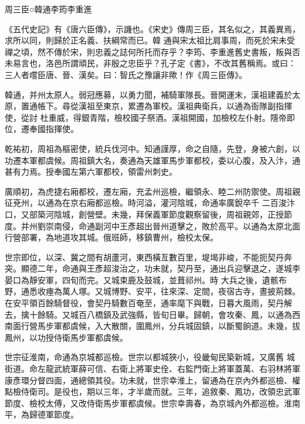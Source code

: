 
\begin{pinyinscope}

 周三臣○韓通李筠李重進



 《五代史記》有《唐六臣傳》，示譏也。《宋史》傳周三臣，其名似之，其義異焉，求所以同，則歸於正名義、扶綱常而已。韓
 通與宋太祖比肩事周，而死於宋未受禪之頃，然不傳於宋，則忠義之誌何所托而存乎？李筠、李重進舊史書叛，叛與否未易言也，洛邑所謂頑民，非殷之忠臣乎？孔子定《書》，不改其舊稱焉。或曰：三人者嚐臣唐、晉、漢矣。曰：智氏之豫讓非歟！作《周三臣傳》。



 韓通，并州太原人。弱冠應募，以勇力聞，補騎軍隊長。晉開運末，漢祖建義於太原，置通帳下。尋從漢祖至東京，累遷為軍校。漢祖典衛兵，以通為衙隊副指揮使，從討
 杜重威，得銀青階，檢校國子祭酒。漢祖開國，加檢校左仆射。隱帝即位，遷奉國指揮使。



 乾祐初，周祖為樞密使，統兵伐河中。知通謹厚，命之自隨，先登，身被六創，以功遷本軍都虞候。周祖鎮大名，奏通為天雄軍馬步軍都校，委以心腹，及入汴，通甚有力焉。授奉國左第六軍都校，領雷州刺史。



 廣順初，為虎捷右廂都校，遷左廂，充孟州巡檢，繼領永、睦二州防禦使。周祖親征兗州，以通為在京右廂都巡檢。時河溢，灌河陰城，命通率廣銳卒千
 二百浚汴口，又部築河陰城，創營壁。未幾，拜保義軍節度觀察留後，周祖親郊，正授節度。并州劉崇南侵，命通副河中王彥超出晉州道擊之，敗於高平。以通為太原北面行營部署，為地道攻其城。俄班師，移鎮曹州，檢校太保。



 世宗即位，以深、冀之間有胡蘆河，東西橫亙數百里，堤堨非峻，不能扼契丹奔突。顯德二年，命通與王彥超浚治之，功未就，契丹至，通出兵迎擊退之，遂城李晏口為靜安軍，四旬而完。又城束鹿及鼓城，並葺祁州。時
 大兵之後，遺骸布野，通悉收瘞為萬人塚。又城博野、安平，往來深、定間，夜宿古寺，晝披荊棘。在安平領百餘騎督役，會契丹騎數百奄至，通率麾下與戰，日暮大風雨，契丹解去，擒十餘騎。又城百八橋鎮及武強縣，皆旬日畢。歸朝，會攻秦、鳳，以通為西南面行營馬步軍都虞候，入大散關，圍鳳州，分兵城固鎮，以斷蜀餉道。未幾，拔鳳州，以功授侍衛馬步軍都虞候。



 世宗征淮南，命通為京城都巡檢。世宗以都城狹小，役畿甸民築新城，又廣舊
 城街道。命左龍武統軍薛可信、右衛上將軍史佺、右監門衛上將軍蓋萬、右羽林將軍康彥環分督四面，通總領其役。功未就，世宗幸淮上，留通為在京內外都巡檢、權點檢侍衛司。是役也，期以三年，才半歲而就。三年，追敘秦、鳳功，改領忠武軍節度、檢校太傅，又改侍衛馬步軍都虞候。世宗幸壽春，為京城內外都巡檢。淮南平，為歸德軍節度。




\end{pinyinscope}
